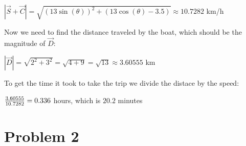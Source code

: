 \documentclass[11pt]{article}
\begin{document}
\(|\vec S+\vec C|=\sqrt{(13\sin(\theta))^2+(13\cos(\theta)-3.5)}\approx10.7282\) km/h

Now we need to find the distance traveled by the boat, which should be the magnitude of \(\vec D\):

\(|\vec D|=\sqrt{2^2+3^2}=\sqrt{4+9}=\sqrt{13}\approx 3.60555\) km

To get the time it took to take the trip we divide the distace by the speed:

\({3.60555\over10.7282}=0.336\) hours, which is \(20.2\) minutes

\section{Problem 2}
\label{sec:orgaff522f}
\end{document}

